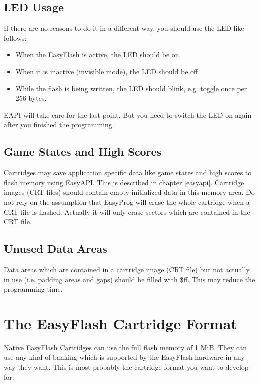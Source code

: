 \documentclass[a4paper,oneside]{memoir}
\begin{document}
\section{LED Usage}

If there are no reasons to do it in a different way, you should use the LED like follows:

\begin{itemize}
  \item When the EasyFlash is active, the LED should be on
  \item When it is inactive (invisible mode), the LED should be off
  \item While the flash is being written, the LED should blink, e.g. toggle once per 256 bytes.
\end{itemize}
EAPI will take care for the last point. But you need to switch the LED on again after you finished the programming.

\section{Game States and High Scores}

Cartridges may save application specific data like game states and high scores to flash memory using EasyAPI. This is described in chapter \ref{easyapi}. Cartridge images (CRT files) should contain empty initialized data in this memory area. Do not rely on the assumption that EasyProg will erase the whole cartridge when a CRT file is flashed. Actually it will only erase sectors which are contained in the CRT file.

\section{Unused Data Areas}

Data areas which are contained in a cartridge image (CRT file) but not actually in use (i.e. padding areas and gaps) should be filled with \$ff. This may reduce the programming time.

\chapter{The EasyFlash Cartridge Format}\label{native-easyflash-cartridges}

Native EasyFlash Cartridges can use the full flash memory of 1 MiB. They can
use any kind of banking which is supported by the EasyFlash hardware in any way
they want. This is most probably the cartridge format you want to develop for.
\end{document}
